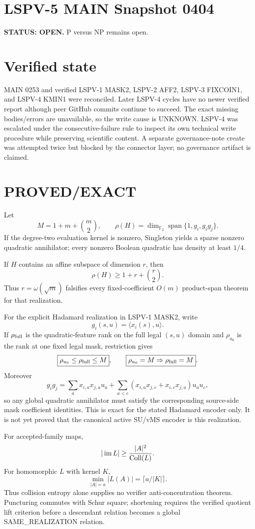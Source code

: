 \documentclass[11pt]{article}
\begin{document}
\section*{LSPV-5 MAIN Snapshot 0404}
\textbf{STATUS: OPEN.} P versus NP remains open.

\section*{Verified state}
MAIN 0253 and verified LSPV-1 MASK2, LSPV-2 AFF2, LSPV-3 FIXCOIN1, and LSPV-4 KMIN1 were reconciled. Later LSPV-4 cycles have no newer verified report although peer GitHub commits continue to succeed. The exact missing bodies/errors are unavailable, so the write cause is UNKNOWN. LSPV-4 was escalated under the consecutive-failure rule to inspect its own technical write procedure while preserving scientific content. A separate governance-note create was attempted twice but blocked by the connector layer; no governance artifact is claimed.

\section*{PROVED/EXACT}
Let
\[
M=1+m+\binom m2,\qquad
\rho(H)=\dim_{\mathbb F_2}\operatorname{span}\{1,g_i,g_i g_j\}.
\]
If the degree-two evaluation kernel is nonzero, Singleton yields a sparse nonzero quadratic annihilator; every nonzero Boolean quadratic has density at least $1/4$.

If $H$ contains an affine subspace of dimension $r$, then
\[
\rho(H)\ge1+r+\binom r2.
\]
Thus $r=\omega(\sqrt m)$ falsifies every fixed-coefficient $O(m)$ product-span theorem for that realization.

For the explicit Hadamard realization in LSPV-1 MASK2, write
\[
g_i(s,u)=\langle x_i(s),u\rangle.
\]
If $\rho_{\rm full}$ is the quadratic-feature rank on the full legal $(s,u)$ domain and $\rho_{u_0}$ is the rank at one fixed legal mask, restriction gives
\[
\boxed{\rho_{u_0}\le\rho_{\rm full}\le M},
\qquad
\boxed{\rho_{u_0}=M\Rightarrow\rho_{\rm full}=M}.
\]
Moreover
\[
g_i g_j=
\sum_a x_{i,a}x_{j,a}u_a+
\sum_{a<c}(x_{i,a}x_{j,c}+x_{i,c}x_{j,a})u_au_c,
\]
so any global quadratic annihilator must satisfy the corresponding source-side mask coefficient identities. This is exact for the stated Hadamard encoder only. It is not yet proved that the canonical active SU/vMS encoder is this realization.

For accepted-family maps,
\[
|\operatorname{im}L|\ge {|A|^2\over\operatorname{Coll}(L)}.
\]
For homomorphic $L$ with kernel $K$,
\[
\min_{|A|=a}|L(A)|=\lceil a/|K|\rceil.
\]
Thus collision entropy alone supplies no verifier anti-concentration theorem. Puncturing commutes with Schur square; shortening requires the verified quotient lift criterion before a descendant relation becomes a global SAME\_REALIZATION relation.
\end{document}
